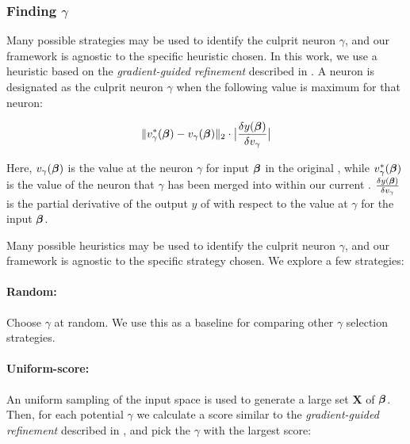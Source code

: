 \subsubsection{Finding $\gamma$}
\label{s:finding-gamma}

Many possible strategies may be used to identify the culprit neuron $\gamma$,
and our framework is agnostic to the specific heuristic chosen. In this work, we
use a heuristic based on the \textit{gradient-guided refinement} described in
\cite{lin-comb-abs-jan}. A neuron is designated as the culprit neuron $\gamma$
when the following value is maximum for that neuron: 

\begin{equation*}
\begin{aligned}
    \|v^{*}_{\gamma}(\boldsymbol{\beta}) - v_{\gamma}(\boldsymbol{\beta})\|_{2} \cdot 
    \big| \frac{\delta y(\boldsymbol{\beta})}{\delta v_{\gamma}} \big|
\end{aligned}
\end{equation*}

Here, $v_{\gamma}(\boldsymbol{\beta})$ is the value at the neuron $\gamma$ for input
$\boldsymbol{\beta}$ in the original \cnc, while $v^{*}_{\gamma}(\boldsymbol{\beta})$ is the
value of the neuron that $\gamma$ has been merged into within our current \abs.
$\frac{\delta y(\boldsymbol{\beta})}{\delta v_{\gamma}}$ is the partial derivative of
the output
$y$ of \cnc with respect to the value at $\gamma$ for the input $\boldsymbol{\beta}$.


Many possible heuristics may be used to identify the culprit neuron $\gamma$,
and our framework is agnostic to the specific strategy chosen. We explore a few
strategies: 

\paragraph*{Random:} Choose $\gamma$ at random. We use this as a
baseline for comparing other $\gamma$ selection strategies. 

\paragraph*{Uniform-score:} An uniform sampling of the input space is used to
generate a large set $\mathbf{X}$ of \gencex $\boldsymbol{\beta}$. Then, for each
potential $\gamma$ we calculate a score similar to the \textit{gradient-guided
refinement} described in \cite{lin-comb-abs-jan}, and pick the $\gamma$ with the
largest score:

